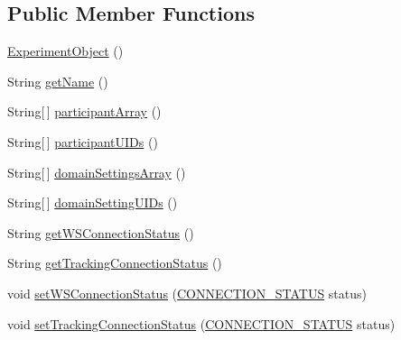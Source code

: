 \subsection*{Public Member Functions}
\begin{DoxyCompactItemize}
\item 
\hyperlink{class_web_analyzer_1_1_u_i_1_1_interaction_objects_1_1_experiment_object_ab4ec83c3bd5603ccc5f88d1e6a7638a2}{Experiment\+Object} ()
\item 
String \hyperlink{class_web_analyzer_1_1_u_i_1_1_interaction_objects_1_1_experiment_object_a5e02c96733933f6e14d50f48fcaf4edc}{get\+Name} ()
\item 
String\mbox{[}$\,$\mbox{]} \hyperlink{class_web_analyzer_1_1_u_i_1_1_interaction_objects_1_1_experiment_object_a1a43f8d6cc9b6b773681f766d8273023}{participant\+Array} ()
\item 
String\mbox{[}$\,$\mbox{]} \hyperlink{class_web_analyzer_1_1_u_i_1_1_interaction_objects_1_1_experiment_object_a5f4674c9f3a4ef9214bd6722f356ff14}{participant\+U\+I\+Ds} ()
\item 
String\mbox{[}$\,$\mbox{]} \hyperlink{class_web_analyzer_1_1_u_i_1_1_interaction_objects_1_1_experiment_object_a150c4672bd1ed68b1db01cf2391107ec}{domain\+Settings\+Array} ()
\item 
String\mbox{[}$\,$\mbox{]} \hyperlink{class_web_analyzer_1_1_u_i_1_1_interaction_objects_1_1_experiment_object_ad35fa2e95cd9c5b7f51a033bebe87beb}{domain\+Setting\+U\+I\+Ds} ()
\item 
String \hyperlink{class_web_analyzer_1_1_u_i_1_1_interaction_objects_1_1_experiment_object_a752a6ca906248d36a0e4251a2bf16959}{get\+W\+S\+Connection\+Status} ()
\item 
String \hyperlink{class_web_analyzer_1_1_u_i_1_1_interaction_objects_1_1_experiment_object_a2116c6efb6ed86405de36aaa6947045b}{get\+Tracking\+Connection\+Status} ()
\item 
void \hyperlink{class_web_analyzer_1_1_u_i_1_1_interaction_objects_1_1_experiment_object_a45f3811e69085ce067f40672803db125}{set\+W\+S\+Connection\+Status} (\hyperlink{class_web_analyzer_1_1_u_i_1_1_interaction_objects_1_1_experiment_object_a2875208b4f4b0ed643593152f4ec025c}{C\+O\+N\+N\+E\+C\+T\+I\+O\+N\+\_\+\+S\+T\+A\+T\+U\+S} status)
\item 
void \hyperlink{class_web_analyzer_1_1_u_i_1_1_interaction_objects_1_1_experiment_object_ac4821e77b0158be25afd4c28ffc4690b}{set\+Tracking\+Connection\+Status} (\hyperlink{class_web_analyzer_1_1_u_i_1_1_interaction_objects_1_1_experiment_object_a2875208b4f4b0ed643593152f4ec025c}{C\+O\+N\+N\+E\+C\+T\+I\+O\+N\+\_\+\+S\+T\+A\+T\+U\+S} status)
\end{DoxyCompactItemize}
